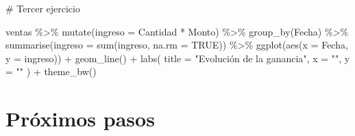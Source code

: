 \documentclass[
  letterpaper,
  DIV=11,
  numbers=noendperiod]{scrreprt}
\newenvironment{Shaded}{\begin{snugshade}}{\end{snugshade}}
\newcommand{\AttributeTok}[1]{\textcolor[rgb]{0.40,0.45,0.13}{#1}}
\newcommand{\CommentTok}[1]{\textcolor[rgb]{0.37,0.37,0.37}{#1}}
\newcommand{\ConstantTok}[1]{\textcolor[rgb]{0.56,0.35,0.01}{#1}}
\newcommand{\FunctionTok}[1]{\textcolor[rgb]{0.28,0.35,0.67}{#1}}
\newcommand{\NormalTok}[1]{\textcolor[rgb]{0.00,0.23,0.31}{#1}}
\newcommand{\SpecialCharTok}[1]{\textcolor[rgb]{0.37,0.37,0.37}{#1}}
\newcommand{\StringTok}[1]{\textcolor[rgb]{0.13,0.47,0.30}{#1}}
\begin{document}
\begin{Shaded}
\begin{Highlighting}[]
\CommentTok{\# Tercer ejercicio}

\NormalTok{ventas }\SpecialCharTok{\%\textgreater{}\%} 
  \FunctionTok{mutate}\NormalTok{(}\AttributeTok{ingreso =}\NormalTok{ Cantidad }\SpecialCharTok{*}\NormalTok{ Monto) }\SpecialCharTok{\%\textgreater{}\%} 
  \FunctionTok{group\_by}\NormalTok{(Fecha) }\SpecialCharTok{\%\textgreater{}\%} 
  \FunctionTok{summarise}\NormalTok{(}\AttributeTok{ingreso =} \FunctionTok{sum}\NormalTok{(ingreso, }\AttributeTok{na.rm =} \ConstantTok{TRUE}\NormalTok{)) }\SpecialCharTok{\%\textgreater{}\%} 
  \FunctionTok{ggplot}\NormalTok{(}\FunctionTok{aes}\NormalTok{(}\AttributeTok{x =}\NormalTok{ Fecha, }\AttributeTok{y =}\NormalTok{ ingreso)) }\SpecialCharTok{+}
  \FunctionTok{geom\_line}\NormalTok{() }\SpecialCharTok{+}
  \FunctionTok{labs}\NormalTok{(}
    \AttributeTok{title =} \StringTok{"Evolución de la ganancia"}\NormalTok{,}
    \AttributeTok{x =} \StringTok{""}\NormalTok{,}
    \AttributeTok{y =} \StringTok{""}
\NormalTok{  ) }\SpecialCharTok{+}
  \FunctionTok{theme\_bw}\NormalTok{()}
\end{Highlighting}
\end{Shaded}


\hypertarget{pruxf3ximos-pasos}{%
\chapter{Próximos pasos}\label{pruxf3ximos-pasos}}



\printindex
\end{document}
